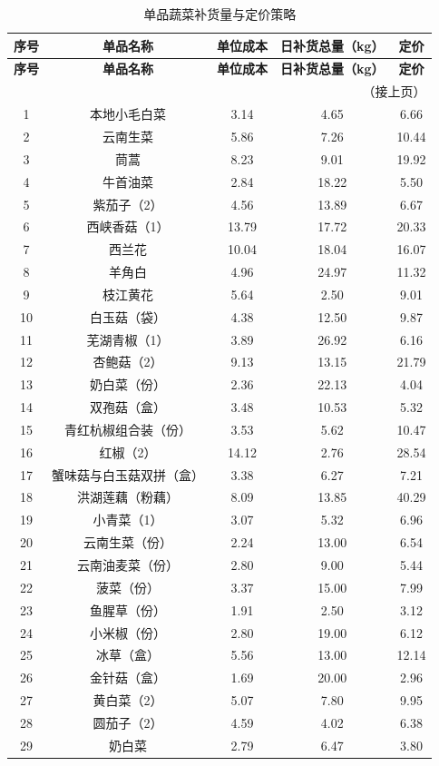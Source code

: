\documentclass[a4paper,12pt]{article}
\begin{document}
	\begin{longtable}{c|c|c|c|c}
		\caption{单品蔬菜补货量与定价策略} \\
		\hline
		\textbf{序号} & \textbf{单品名称} & \textbf{单位成本} & \textbf{日补货总量（kg）} & \textbf{定价} \\
		\hline
		\endfirsthead
		\hline
		\textbf{序号} & \textbf{单品名称} & \textbf{单位成本} & \textbf{日补货总量（kg）} & \textbf{定价} \\
		\hline
		\endhead
		\hline
		\multicolumn{5}{r}{（接上页）} \\
		\endfoot
		\hline
		\endlastfoot
		
		1 & 本地小毛白菜 & 3.14 & 4.65 & 6.66 \\
		2 & 云南生菜 & 5.86 & 7.26 & 10.44 \\
		3 & 茼蒿 & 8.23 & 9.01 & 19.92 \\
		4 & 牛首油菜 & 2.84 & 18.22 & 5.50 \\
		5 & 紫茄子（2） & 4.56 & 13.89 & 6.67 \\
		6 & 西峡香菇（1） & 13.79 & 17.72 & 20.33 \\
		7 & 西兰花 & 10.04 & 18.04 & 16.07 \\
		8 & 羊角白 & 4.96 & 24.97 & 11.32 \\
		9 & 枝江黄花 & 5.64 & 2.50 & 9.01 \\
		10 & 白玉菇（袋） & 4.38 & 12.50 & 9.87 \\
		11 & 芜湖青椒（1） & 3.89 & 26.92 & 6.16 \\
		12 & 杏鲍菇（2） & 9.13 & 13.15 & 21.79 \\
		13 & 奶白菜（份） & 2.36 & 22.13 & 4.04 \\
		14 & 双孢菇（盒） & 3.48 & 10.53 & 5.32 \\
		15 & 青红杭椒组合装（份） & 3.53 & 5.62 & 10.47 \\
		16 & 红椒（2） & 14.12 & 2.76 & 28.54 \\
		17 & 蟹味菇与白玉菇双拼（盒） & 3.38 & 6.27 & 7.21 \\
		18 & 洪湖莲藕（粉藕） & 8.09 & 13.85 & 40.29 \\
		19 & 小青菜（1） & 3.07 & 5.32 & 6.96 \\
		20 & 云南生菜（份） & 2.24 & 13.00 & 6.54 \\
		21 & 云南油麦菜（份） & 2.80 & 9.00 & 5.44 \\
		22 & 菠菜（份） & 3.37 & 15.00 & 7.99 \\
		23 & 鱼腥草（份） & 1.91 & 2.50 & 3.12 \\
		24 & 小米椒（份） & 2.80 & 19.00 & 6.12 \\
		25 & 冰草（盒） & 5.56 & 13.00 & 12.14 \\
		26 & 金针菇（盒） & 1.69 & 20.00 & 2.96 \\
		27 & 黄白菜（2） & 5.07 & 7.80 & 9.95 \\
		28 & 圆茄子（2） & 4.59 & 4.02 & 6.38 \\
		29 & 奶白菜 & 2.79 & 6.47 & 3.80 \\
		
	\end{longtable}
	

	
\end{document}
